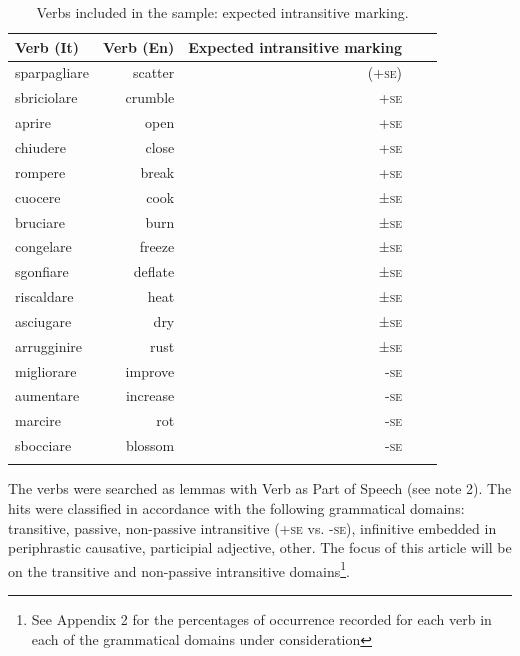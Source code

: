 \documentclass[output=paper,colorlinks,citecolor=brown
]{langscibook}
\begin{document}
\begin{table}[hbt!]
\caption{Verbs included in the sample: expected intransitive marking. }
\label{tab:bentley_table_1}
 \begin{tabularx}{.8\textwidth}{X rrrr}
  \lsptoprule
  Verb (It)  & Verb (En) & Expected intransitive marking \\
  \midrule
sparpagliare & 	scatter	& (+\textsc{se}) \\
sbriciolare &	crumble	& +\textsc{se} \\
aprire 	& open	& +\textsc{se} \\
chiudere &	close	& +\textsc{se} \\
rompere &	break	& +\textsc{se} \\
cuocere &	cook	& ±\textsc{se} \\
bruciare &	burn	& ±\textsc{se} \\
congelare &	freeze	& ±\textsc{se} \\
sgonfiare &	deflate	& ±\textsc{se} \\
riscaldare &	heat	& ±\textsc{se} \\
asciugare &	dry	& ±\textsc{se} \\
arrugginire &	rust	& ±\textsc{se} \\
migliorare &	improve	& -\textsc{se} \\
aumentare &	increase	& -\textsc{se} \\
marcire	& rot	& -\textsc{se} \\
sbocciare &	blossom	& -\textsc{se} \\
  \lspbottomrule
 \end{tabularx}
\end{table}

The verbs were searched as lemmas with Verb as Part of Speech (see note 2). The hits were classified in accordance with the following grammatical domains: transitive, passive, non-passive intransitive (+\textsc{se} vs. -\textsc{se}), infinitive embedded in periphrastic causative, participial adjective, other. The focus of this article will be on the transitive and non-passive intransitive domains\footnote{See Appendix 2 for the percentages of occurrence recorded for each verb in each of the grammatical domains under consideration}. 
\end{document}
